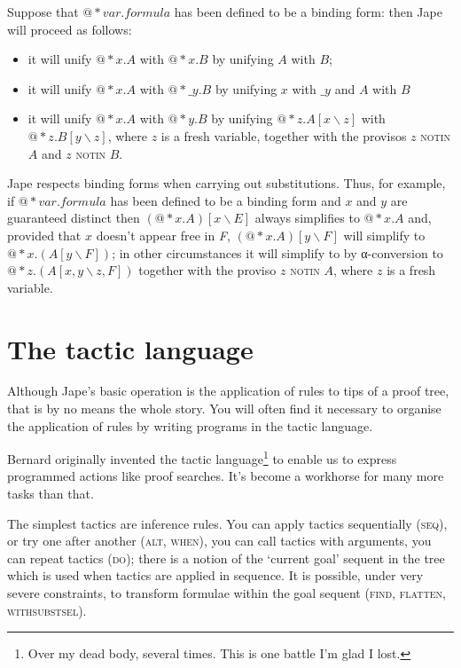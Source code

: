 Suppose that $@*var.formula$ has been defined to be a binding form: then Jape will proceed as follows:
\begin{itemize}
\item it will unify $@*x.A$ with $@*x.B$ by unifying $A$ with $B$;
\item it will unify $@*x.A$ with $@*\_y.B$ by unifying $x$ with $\_y$ and $A$ with $B$
\item it will unify $@*x.A$ with $@*y.B$ by unifying $@*z.A[x\backslash z]$ with $@*z.B[y\backslash z]$, where $z$ is a fresh variable, together with the provisos $z$ \textsc{notin} $A$ and $z$ \textsc{notin} $B$.
\end{itemize}

Jape respects binding forms when carrying out substitutions. Thus, for example, if $@*var.formula$ has been defined to be a binding form and $x$ and $y$ are guaranteed distinct then $(@*x.A)[x\backslash E]$ always simplifies to $@*x.A$ and, provided that $x$ doesn't appear free in \textit{F}, $(@*x.A)[y\backslash F]$ will simplify to $@*x.(A[y\backslash F])$; in other circumstances it will simplify to by α-conversion to $@*z.(A[x,y\backslash z,F])$ together with the proviso $z$ \textsc{notin} $A$, where $z$ is a fresh variable.

\section{The tactic language}

Although Jape's basic operation is the application of rules to tips of a proof tree, that is by no means the whole story. You will often find it necessary to organise the application of rules by writing programs in the tactic language.

Bernard originally invented the tactic language\footnote{Over my dead body, several times. This is one battle I'm glad I lost.} to enable us to express programmed actions like proof searches. It's become a workhorse for many more tasks than that.

The simplest tactics are inference rules. You can apply tactics sequentially (\textsc{seq}), or try one after another (\textsc{alt, when}), you can call tactics with arguments, you can repeat tactics (\textsc{do}); there is a notion of the `current goal' sequent in the tree which is used when tactics are applied in sequence. It is possible, under very severe constraints, to transform formulae within the goal sequent (\textsc{find, flatten, withsubstsel}).

